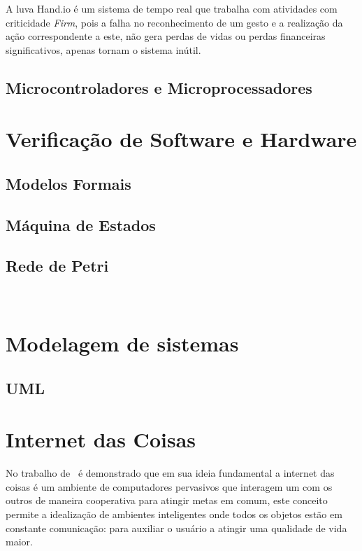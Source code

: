 A luva Hand.io é um sistema de tempo real que trabalha com atividades com criticidade \textit{Firm}, pois a falha no reconhecimento de um gesto e a realização da ação correspondente a este, não gera perdas de vidas ou perdas financeiras significativos, apenas tornam o sistema inútil.


\subsection{Microcontroladores e Microprocessadores}




\section{Verificação de Software e Hardware}


\subsection{Modelos Formais}


\subsection{Máquina de Estados}


\subsection{Rede de Petri}
~\cite{VALK:2002}

\section{Modelagem de sistemas}

\subsection{UML}

\section{Internet das Coisas}

No trabalho de~\cite{ATZORI:2010} é demonstrado que em sua ideia fundamental a internet das coisas é um ambiente de computadores pervasivos que interagem um com os outros de maneira cooperativa para atingir metas em comum, este conceito permite a idealização de ambientes inteligentes onde todos os objetos estão em constante comunicação: para auxiliar o usuário a atingir uma qualidade de vida maior.

